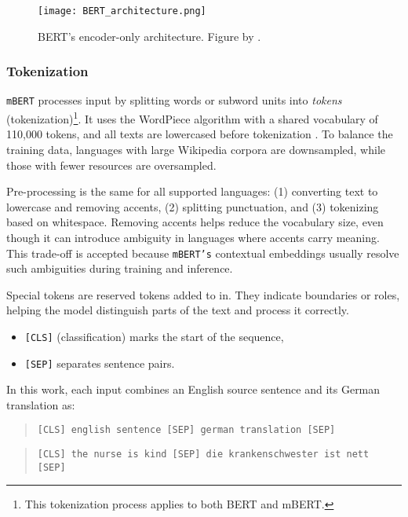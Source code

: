 \begin{figure}
    \centering
	\texttt{[image: BERT\_architecture.png]}	
    \caption{BERT's encoder-only architecture. Figure by \textcite{smithCompleteGuideBERT2024}.}
    \label{fig:bert_arch}
\end{figure}

\subsubsection{Tokenization}
\texttt{mBERT} processes input by splitting words or subword units into \textit{tokens} (tokenization)\footnote{This tokenization process applies to both BERT and mBERT.}. It uses the WordPiece algorithm with a shared vocabulary of 110,000 tokens, and all texts are lowercased before tokenization \parencite{devlinMultilingualBERTGitHub2018}. To balance the training data, languages with large Wikipedia corpora are downsampled, while those with fewer resources are oversampled.

Pre-processing is the same for all supported languages: (1) converting text to lowercase and removing accents, (2) splitting punctuation, and (3) tokenizing based on whitespace. Removing accents helps reduce the vocabulary size, even though it can introduce ambiguity in languages where accents carry meaning. This trade-off is accepted because \texttt{mBERT's} contextual embeddings usually resolve such ambiguities during training and inference.

Special tokens are reserved tokens added to in. They indicate boundaries or roles, helping the model distinguish parts of the text and process it correctly.

\begin{itemize}
	\item \texttt{[CLS]} (classification) marks the start of the sequence,
	\item \texttt{[SEP]} separates sentence pairs.
\end{itemize}

\noindent In this work, each input combines an English source sentence and its German translation as:

\begin{quote}
    \texttt{[CLS] english sentence [SEP] german translation [SEP]}
\end{quote}

\begin{quote}
\texttt{[CLS] the nurse is kind [SEP] die krankenschwester ist nett [SEP]}
\end{quote}

